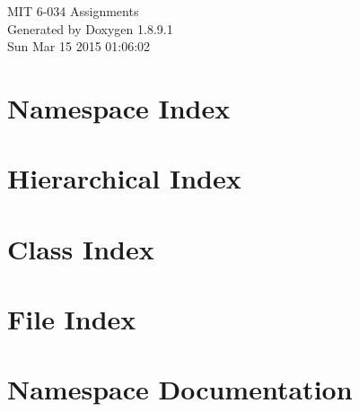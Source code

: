 \documentclass[twoside]{book}
\newcommand{\+}{\discretionary{\mbox{\scriptsize$\hookleftarrow$}}{}{}}
\newcommand{\clearemptydoublepage}{%
  \newpage{\pagestyle{empty}\cleardoublepage}%
}
\begin{document}
\hypersetup{pageanchor=false,
             bookmarks=true,
             bookmarksnumbered=true,
             pdfencoding=unicode
            }
\begin{titlepage}
\vspace*{7cm}
\begin{center}%
{\Large M\+I\+T 6-\/034 Assignments }\\
\vspace*{1cm}
{\large Generated by Doxygen 1.8.9.1}\\
\vspace*{0.5cm}
{\small Sun Mar 15 2015 01:06:02}\\
\end{center}
\end{titlepage}
\clearemptydoublepage
\tableofcontents
\clearemptydoublepage
{}
\hypersetup{pageanchor=true}

\chapter{Namespace Index}

\chapter{Hierarchical Index}

\chapter{Class Index}

\chapter{File Index}

\chapter{Namespace Documentation}





























\end{document}
